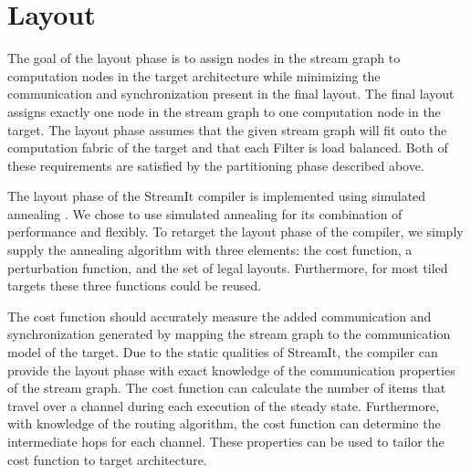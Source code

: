 \section{Layout}
\label{sec:layout}

The goal of the layout phase is to assign nodes in the stream graph to
computation nodes in the target architecture while minimizing the
communication and synchronization present in the final layout.  The
final layout assigns exactly one node in the stream graph to one
computation node in the target.  The layout phase assumes that the
given stream graph will fit onto the computation fabric of the target
and that each Filter is load balanced.  Both of these requirements are
satisfied by the partitioning phase described above.



The layout phase of the StreamIt compiler is implemented using
simulated annealing \cite{simanneal}.
We chose to use simulated annealing for its combination of performance and
flexibly.  To retarget the layout phase of the compiler, we simply
supply the annealing algorithm with three elements: the cost function,
a perturbation function, and the set of legal layouts.  Furthermore,
for most tiled targets these three functions could be reused.

The cost function should accurately measure the added communication
and synchronization generated by mapping the stream graph to the
communication model of the target.  Due to the static qualities of
StreamIt, the compiler can provide the layout phase with exact
knowledge of the communication properties of the stream graph.  The
cost function can calculate the number of items that travel over a
channel during each execution of the steady state.  Furthermore, with
knowledge of the routing algorithm, the cost function can determine
the intermediate hops for each channel.  These properties can be used
to tailor the cost function to target architecture.



